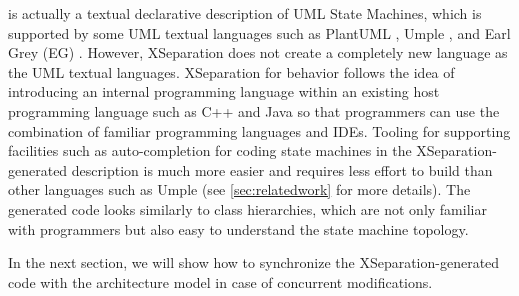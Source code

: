 \vskip 0.1cm
\noindent
{} 
 is actually a textual declarative description of UML State Machines, which is supported by some UML textual languages such as PlantUML \cite{plantuml}, Umple \cite{lethbridge2010umplification}, and Earl Grey (EG) \cite{mazanec2012general}.
However, XSeparation does not create a completely new language as the UML textual languages. 
XSeparation for behavior follows the idea of introducing an internal programming language within an existing host programming language such as C++ and Java \cite{Hinkel2015} so that programmers can use the combination of familiar programming languages and IDEs.
Tooling for supporting facilities such as auto-completion for coding state machines in the XSeparation-generated description is much more easier and requires less effort to build than other languages such as Umple (see \ref{sec:relatedwork} for more details). 
The generated code looks similarly to class hierarchies, which are not only familiar with programmers but also easy to understand the state machine topology. 

In the next section, we will show how to synchronize the XSeparation-generated code with the architecture model in case of concurrent modifications. 



	

\begin{comment}{1.05\columnwidth}
	\begin{lstlisting}[language=C++, caption=A segment of C++ front-end code, label=lst:effect-segment,frame=f]
	void method1(int p1, int p2) {
	//method1 body
	}
	void effect1(int p1, int p2) {
	//effect1 body
	}
	void effect2(Sig& s) {
	//effect2 body
	}
	\end{lstlisting}
\end{comment}





